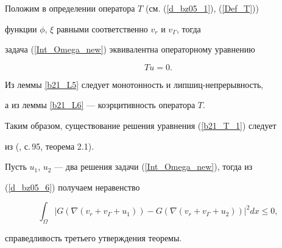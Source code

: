 \begin{pf}


Положим в определении оператора $T$ (см. (\ref{d_bz05_1}), (\ref{Def_T}))


функции $\phi$, $\xi$ равными соответственно $v_{r}$ и $v_{\Gamma}$, тогда


задача (\ref{Int_Omega_new}) эквивалентна операторному уравнению


\begin{equation}


\label{b21_T_1}


Tu=0.


\end{equation}


Из леммы \ref{b21_L5} следует монотонность и липшиц-непрерывность,


а из леммы \ref{b21_L6} --- коэрцитивность оператора $T$.


Таким образом, существование решения уравнения (\ref{b21_T_1}) следует


из (\cite{GGZ_78}, с.\,95, теорема 2.1).





Пусть $u_1$, $u_2$ --- два решения задачи (\ref{Int_Omega_new}), тогда из


(\ref{d_bz05_6}) получаем неравенство


$$


\int_{\Omega}


|G(\nabla (v_{r}+v_{\Gamma}+u_1))-G(\nabla (v_{r}+v_{\Gamma}+u_2))|^2 dx


\leq 0,


$$


справедливость третьего утверждения теоремы.


\end{pf}








